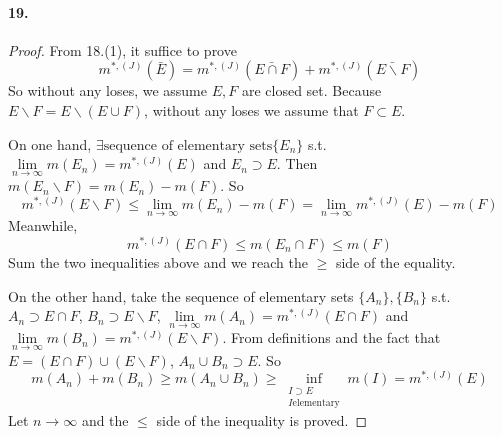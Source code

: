 \documentclass{article}
\begin{document}
\paragraph{19.}
\begin{proof}
From 18.(1), it suffice to prove
\[m^{*,(J)}(\bar{E})=m^{*,(J)}(\bar{E\cap F})+m^{*,(J)}(\bar{E\backslash F})\]
So without any loses, we assume $E,F$ are closed set. Because $E\backslash F=E\backslash (E\cup F)$, without any loses we assume that $F\subset E$.

On one hand, $\exists \text{sequence of elementary sets}\{E_n\}$ s.t. $\lim\limits_{n\to\infty}m(E_n)=m^{*,(J)}(E)$ and $E_n\supset E$. Then $m(E_n\backslash F)=m(E_n)-m(F)$. So \[m^{*,(J)}(E\backslash F)\leq \lim\limits_{n\to\infty}m(E_n)-m(F)=\lim\limits_{n\to\infty}m^{*,(J)}(E)-m(F)\] Meanwhile, \[m^{*,(J)}(E\cap F)\leq m(E_n\cap F)\leq m(F)\] Sum the two inequalities above and we reach the $\geq$ side of the equality.

On the other hand, take the sequence of elementary sets $\{A_n\},\{B_n\}$ s.t. $A_n\supset E\cap F$, $B_n\supset E\backslash F$, $\lim\limits_{n\to\infty}m(A_n)=m^{*,(J)}(E\cap F)$ and $\lim\limits_{n\to\infty}m(B_n)=m^{*,(J)}(E\backslash F)$. From definitions and the fact that $E=(E\cap F)\cup (E\backslash F)$, $A_n\cup B_n\supset E$. So 
\[m(A_n)+m(B_n)\geq m(A_n\cup B_n)\geq \inf\limits_{\substack{I\supset E\\I \text{elementary}}}m(I)=m^{*,(J)}(E)\]
Let $n\to\infty$ and the $\leq$ side of the inequality is proved.
\end{proof}
\end{document}
